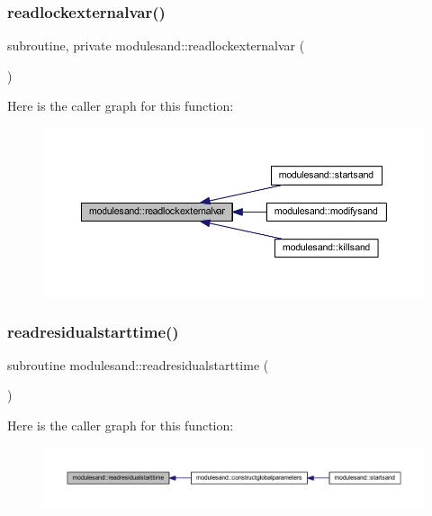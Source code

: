 \subsubsection{\texorpdfstring{readlockexternalvar()}{readlockexternalvar()}}
{\footnotesize\ttfamily subroutine, private modulesand\+::readlockexternalvar (\begin{DoxyParamCaption}{ }\end{DoxyParamCaption})\hspace{0.3cm}{\ttfamily [private]}}

Here is the caller graph for this function\+:\nopagebreak
\begin{figure}[H]
\begin{center}
\leavevmode
\includegraphics[width=350pt]{namespacemodulesand_a3bbda76d81b4711c3b088303a6953f52_icgraph}
\end{center}
\end{figure}
\mbox{\label{namespacemodulesand_a402ee8638c7fb9c825536051d1a6c5e8}} 
\subsubsection{\texorpdfstring{readresidualstarttime()}{readresidualstarttime()}}
{\footnotesize\ttfamily subroutine modulesand\+::readresidualstarttime (\begin{DoxyParamCaption}{ }\end{DoxyParamCaption})\hspace{0.3cm}{\ttfamily [private]}}

Here is the caller graph for this function\+:\nopagebreak
\begin{figure}[H]
\begin{center}
\leavevmode
\includegraphics[width=350pt]{namespacemodulesand_a402ee8638c7fb9c825536051d1a6c5e8_icgraph}
\end{center}
\end{figure}
\mbox{\label{namespacemodulesand_af758b46396eb7217217ae5f30679be76}} 

